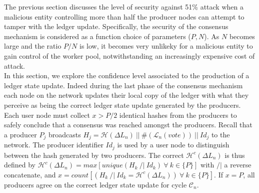 
The previous section discusses the level of security against 51\% attack when a malicious entity controlling more than half the producer nodes can attempt to tamper with the ledger update. Specifically, the security of the consensus mechanism is considered as a function choice of parameters ($P,N$). As $N$ becomes large and the ratio $P/N$ is low, it becomes very unlikeky for a malicious entity to gain control of the worker pool, notwithstanding an increasingly expensive cost of attack. \\

In this section, we explore the confidence level associated to the production of a ledger state update. Indeed during the last phase of the consensus mechanism each node on the network updates their local copy of the ledger with what they perceive as being the correct ledger state update generated by the producers. Each user node must collect $x > P/2$ identical hashes from the producers to safely conclude that a consensus was reached amongst the producers. Recall that a producer $P_j$ broadcasts $H_{j} = \mathcal{H}(\Delta L_n)~||~\#(\mathcal{L}_{n}(vote))~||~Id_j$ to the network. The producer identifier $Id_j$ is used by a user node to distinguish between the hash generated by two producers. The correct $\mathcal{H}^c(\Delta L_n)$ is thus defined by $\mathcal{H}^c(\Delta L_n) = max[unique(H_k~/|~Id_k)~\forall~k\in\{P\}]$ with $/|$ a reverse concatenate, and $x = count[(H_k~/|~ Id_k= \mathcal{H}^c(\Delta L_n))~\forall~k\in\{P\}]$. If $x=P$, all producers agree on the correct ledger state update for cycle $\mathcal{C}_n$. \\

